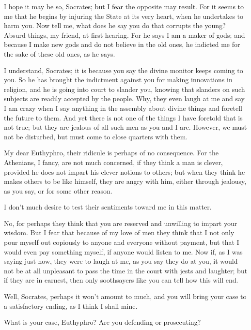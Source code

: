 \documentclass[letterpaper,12pt]{article}
\newcommand{\stephpag}[1]{\marginnote{\small\itshape\fontfamily{ppl}\selectfont #1}}
\begin{document}
\begin{drama}
\euthyphrospeaks
I hope it may be so, Socrates; but I fear the opposite may result. For it seems to me that he begins by injuring the State at its very heart, when he undertakes to harm you. Now tell me, what does he say you do that corrupts the young? \stephpag{b}
\clearpage
\socratesspeaks
Absurd things, my friend, at first hearing. For he says I am a maker of gods; and because I make new gods and do not believe in the old ones, he indicted me for the sake of these old ones, as he says.

\euthyphrospeaks
I understand, Socrates; it is because you say the divine monitor keeps coming to you. So he has brought the indictment against you for making innovations in religion, and he is going into court to slander you, knowing that slanders on such subjects are readily accepted by the people. Why, they even laugh at me and say I am crazy \stephpag{c} when I say anything in the assembly about divine things and foretell the future to them. And yet there is not one of the things I have foretold that is not true; but they are jealous of all such men as you and I are. However, we must not be disturbed, but must come to close quarters with them.

\socratesspeaks
My dear Euthyphro, their ridicule is perhaps of no consequence. For the Athenians, I fancy, are not much concerned, if they think a man is clever, provided he does not impart his clever notions to others; but when they think he makes others to be like himself, \stephpag{d} they are angry with him, either through jealousy, as you say, or for some other reason.

\euthyphrospeaks
I don't much desire to test their sentiments toward me in this matter.

\socratesspeaks
No, for perhaps they think that you are reserved and unwilling to impart your wisdom. But I fear that because of my love of men they think that I not only pour myself out copiously to anyone and everyone without payment, but that I would even pay something myself, if anyone would listen to me. Now if, as I was saying just now, they were to laugh at me, as you say they do at you, it would not be at all unpleasant \stephpag{e} to pass the time in the court with jests and laughter; but if they are in earnest, then only soothsayers like you can tell how this will end.

\euthyphrospeaks
Well, Socrates, perhaps it won't amount to much, and you will bring your case to a satisfactory ending, as I think I shall mine.

\socratesspeaks
What is your case, Euthyphro? Are you defending or prosecuting?


\end{drama}
\end{document}

